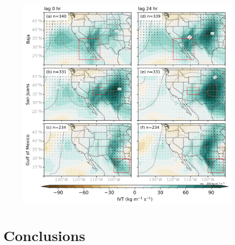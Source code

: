 \documentclass[draft]{agujournal2019}
\begin{document}
\begin{figure}
\noindent\includegraphics[width=\textwidth]{fig10.png}
\label{fig:anom_composites_MJJASO}
\caption{}
\end{figure}




\section{Conclusions}
\label{conclusions}

\end{document}
